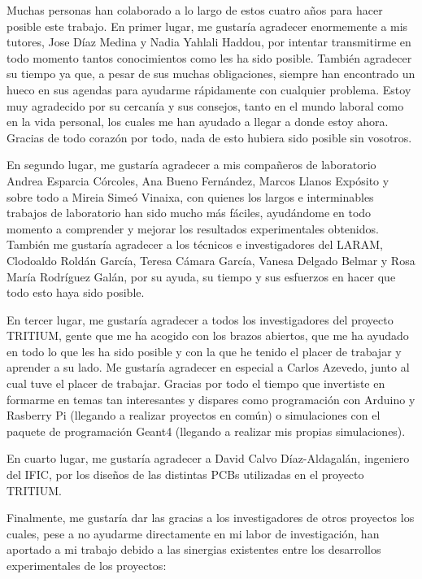 Muchas personas han colaborado a lo largo de estos cuatro años para hacer posible este trabajo. En primer lugar, me gustaría agradecer enormemente a mis tutores, Jose Díaz Medina y Nadia Yahlali Haddou, por intentar transmitirme en todo momento tantos conocimientos como les ha sido posible. También agradecer su tiempo ya que, a pesar de sus muchas obligaciones, siempre han encontrado un hueco en sus agendas para ayudarme rápidamente con cualquier problema. Estoy muy agradecido por su cercanía y sus consejos, tanto en el mundo laboral como en la vida personal, los cuales me han ayudado a llegar a donde estoy ahora. Gracias de todo corazón por todo, nada de esto hubiera sido posible sin vosotros.

En segundo lugar, me gustaría agradecer a mis compañeros de laboratorio Andrea Esparcia Córcoles, Ana Bueno Fernández, Marcos Llanos Expósito y sobre todo a Mireia Simeó Vinaixa, con quienes los largos e interminables trabajos de laboratorio han sido mucho más fáciles, ayudándome en todo momento a comprender y mejorar los resultados experimentales obtenidos.  También me gustaría agradecer a los técnicos e investigadores del LARAM, Clodoaldo Roldán García, Teresa Cámara García, Vanesa Delgado Belmar y Rosa María Rodríguez Galán, por su ayuda, su tiempo y sus esfuerzos en hacer que todo esto haya sido posible.

En tercer lugar, me gustaría agradecer a todos los investigadores del proyecto TRITIUM, gente que me ha acogido con los brazos abiertos, que me ha ayudado en todo lo que les ha sido posible y con la que he tenido el placer de trabajar y aprender a su lado. Me gustaría agradecer en especial a Carlos Azevedo, junto al cual tuve el placer de trabajar. Gracias por todo el tiempo que invertiste en formarme en temas tan interesantes y dispares como programación con Arduino y Rasberry Pi (llegando a realizar proyectos en común) o simulaciones con el paquete de programación Geant4 (llegando a realizar mis propias simulaciones).

En cuarto lugar, me gustaría agradecer a David Calvo Díaz-Aldagalán, ingeniero del IFIC, por los diseños de las distintas PCBs utilizadas en el proyecto TRITIUM.

Finalmente, me gustaría dar las gracias a los investigadores de otros proyectos los cuales, pese a no ayudarme directamente en mi labor de investigación, han aportado a mi trabajo debido a las sinergias existentes entre los desarrollos experimentales de los proyectos:

